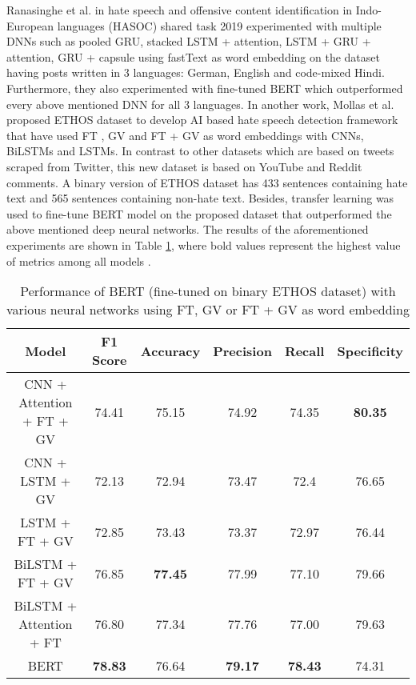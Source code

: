\documentclass[runningheads]{llncs}
\begin{document}
Ranasinghe et al. \cite{ranasinghe2019brums} in hate
speech and offensive content identification in Indo-European languages
(HASOC) shared task 2019 experimented with multiple DNNs such as pooled GRU, stacked LSTM + attention, LSTM + GRU + attention, GRU + capsule using fastText as word embedding on the dataset having posts written in 3 languages: German, English and code-mixed Hindi. Furthermore, they also experimented with fine-tuned BERT \cite{devlin2018bert} which outperformed every above mentioned DNN for all 3 languages. In another work, Mollas et al. \cite{mollas2020ethos} proposed ETHOS dataset to develop AI based hate speech detection framework that have used FT \cite{joulin2016fasttext}, GV \cite{pennington2014glove} and FT + GV as word embeddings with CNNs, BiLSTMs and LSTMs. In contrast to other datasets which are based on tweets scraped from Twitter, this new dataset is based on YouTube and Reddit comments. A binary version of ETHOS dataset has 433 sentences containing hate text and 565 sentences containing non-hate text. Besides, transfer learning was used to fine-tune BERT model on the proposed dataset that outperformed the above mentioned deep neural networks. The results of the aforementioned experiments are shown in Table \ref{table1}, where bold values represent the highest value of metrics among all models \cite{mollas2020ethos}.

\begin{table}[H]
\centering
\caption{Performance of BERT (fine-tuned on binary ETHOS dataset) with various neural networks using FT, GV or FT + GV as word embedding \cite{mollas2020ethos}}\label{table1}
\begin{tabular}{|c|c|c|c|c|c|}
\hline
 Model &  F1 Score & Accuracy & Precision  & Recall & Specificity\\
\hline
CNN + Attention + FT + GV &	74.41 &	75.15 &	74.92 & 74.35 &	{\bfseries 80.35}\\
\hline
CNN + LSTM + GV	& 72.13	& 72.94	& 73.47	& 72.4	& 76.65\\
\hline
LSTM + FT + GV	& 72.85	& 73.43	& 73.37	& 72.97	& 76.44\\
\hline
BiLSTM + FT + GV	& 76.85	& {\bfseries 77.45} &	77.99	& 77.10	& 79.66\\
\hline
BiLSTM + Attention + FT	& 76.80	& 77.34	& 77.76	& 77.00	& 79.63\\
\hline
BERT	& {\bfseries 78.83} &	76.64	& {\bfseries 79.17} & 	{\bfseries 78.43} &	74.31\\
\hline
\end{tabular}
\end{table}
\end{document}
